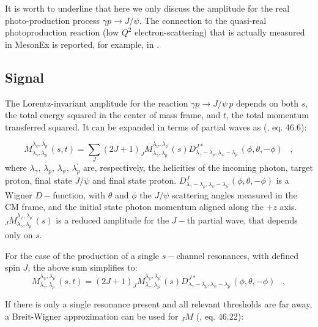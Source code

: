 \documentclass[a4paper,10pt]{article}
\begin{document}
It is worth to underline that here we only discuss the amplitude for the real photo-production process $\gamma p \rightarrow J/\psi$. The connection to the quasi-real photoproduction reaction (low $Q^2$ electron-scattering) that is actually measured in MesonEx is reported, for example, in \cite{mythesis}.

\subsection{Signal}

The Lorentz-invariant amplitude for the reaction  $\gamma p \rightarrow J/\psi \, p$ depends on both $s$, the total energy squared in the center of mass frame, and $t$, the total momentum transferred squared. It can be expanded in terms of partial waves as (\cite{Agashe:2014kda}, eq. 46.6):

\begin{equation}
M_{\lambda_\gamma,\lambda_p}^{\lambda_\psi,\lambda_{p^{\prime}}} (s,t) = \sum_J (2J+1)_JM_{\lambda_\gamma,\lambda_p}^{\lambda_\psi,\lambda_{p^{\prime}}} (s) {D^{J*}_{\lambda_\gamma - \lambda_p, \lambda_\psi-\lambda_{p^\prime}}}(\phi,\theta,-\phi) \; \; \; ,
\end{equation}
where $\lambda_\gamma$, $\lambda_p$, $\lambda_\psi$, $\lambda_p^{\prime}$ are, respectively, the helicities of the incoming photon, target proton, final state $J/\psi$ and final state proton. $D^J_{\lambda_\gamma - \lambda_p, \lambda_\psi-\lambda_{p^\prime}}(\phi,\theta,-\phi)$ is a Wigner $D-$function, with $\theta$ and $\phi$ the $J/\psi$ scattering angles measured in the CM frame, and the initial state photon momentum aligned along the $+z$ axis.
$_JM_{\lambda_\gamma,\lambda_p}^{\lambda_\psi,\lambda_{p^{\prime}}} (s)$ is a reduced amplitude for the $J-$th partial wave, that depends only on $s$.

For the case of the production of a single $s-$channel resonances, with defined spin $J$, the above sum simplifies to:
\begin{equation}
M_{\lambda_\gamma,\lambda_p}^{\lambda_\psi,\lambda_{p^{\prime}}} (s,t) = (2J+1)_JM_{\lambda_\gamma,\lambda_p}^{\lambda_\psi,\lambda_{p^{\prime}}} (s) {D^{J*}_{\lambda_\gamma - \lambda_p, \lambda_\psi-\lambda_{p^\prime}}}(\phi,\theta,-\phi) \; \; \; ,
\end{equation}

If there is only a single resonance present and all relevant thresholds are far away, a Breit-Wigner approximation can be used for $_JM$ (\cite{Agashe:2014kda}, eq. 46.22):
\end{document}
